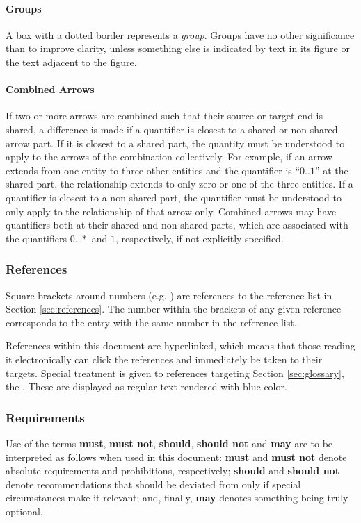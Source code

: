 \paragraph{Groups}
A box with a dotted border represents a \textit{group}.
Groups have no other significance than to improve clarity, unless something else is indicated by text in its figure or the text adjacent to the figure.

\paragraph{Combined Arrows}
If two or more arrows are combined such that their source or target end is shared, a difference is made if a quantifier is closest to a shared or non-shared arrow part.
If it is closest to a shared part, the quantity must be understood to apply to the arrows of the combination collectively.
For example, if an arrow extends from one entity to three other entities and the quantifier is ``$0..1$'' at the shared part, the relationship extends to only zero or one of the three entities.
If a quantifier is closest to a non-shared part, the quantifier must be understood to only apply to the relationship of that arrow only.
Combined arrows may have quantifiers both at their shared and non-shared parts, which are associated with the quantifiers $0..*$ and $1$, respectively, if not explicitly specified.

\subsubsection{References}

Square brackets around numbers (e.g. \cite{delsing2017iot}) are references to the reference list in Section \ref{sec:references}.
The number within the brackets of any given reference corresponds to the entry with the same number in the reference list.

References within this document are hyperlinked, which means that those reading it electronically can click the references and immediately be taken to their targets.
Special treatment is given to references targeting Section \ref{sec:glossary}, the .
These are displayed as regular text rendered with blue color.

\subsubsection{Requirements}

Use of the terms \textbf{must}, \textbf{must not}, \textbf{should}, \textbf{should not} and \textbf{may} are to be interpreted as follows when used in this document: \textbf{must} and \textbf{must not} denote absolute requirements and prohibitions, respectively; \textbf{should} and \textbf{should not} denote recommendations that should be deviated from only if special circumstances make it relevant; and, finally, \textbf{may} denotes something being truly optional.

